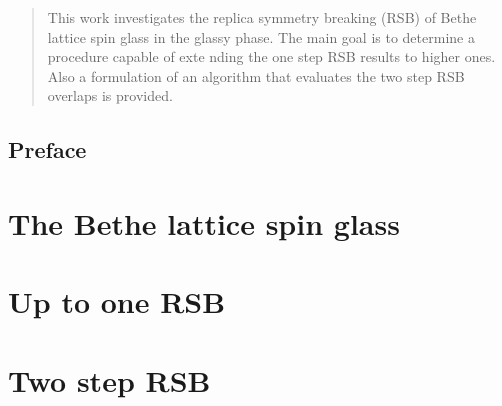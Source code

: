 \documentclass{amsbook}%
\theoremstyle{plain}
\numberwithin{equation}{section}
\begin{document}
\frontmatter





\begin{abstract}
This work investigates the replica symmetry breaking (RSB) of
Bethe lattice spin glass in the glassy phase.
The main goal is to determine a procedure capable of exte
nding the
one step RSB results to higher ones.
Also a formulation of an algorithm that evaluates the two step RSB overlaps is provided.

\end{abstract}

\maketitle

\tableofcontents


\chapter*{Preface}


\mainmatter

\part{The Bethe lattice spin glass}






\part{Up to one RSB}







\part{Two step RSB}









\backmatter \appendix



\begin{thebibliography}{9}


\end{thebibliography}
\end{document}
